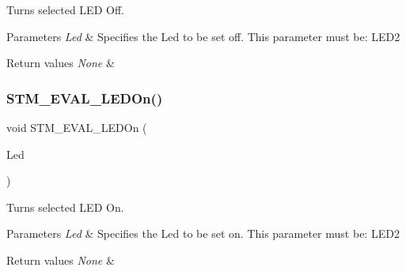 Turns selected L\+ED Off. 


\begin{DoxyParams}{Parameters}
{\em Led} & Specifies the Led to be set off. This parameter must be\+: L\+E\+D2 \\
\hline
\end{DoxyParams}

\begin{DoxyRetVals}{Return values}
{\em None} & \\
\hline
\end{DoxyRetVals}
\mbox{\label{group___s_t_m32_f1_x_x___n_u_c_l_e_o___l_o_w___l_e_v_e_l___exported___functions_gad27fa430d867e6dde94cb7896fcc42fc}} 
\subsubsection{\texorpdfstring{STM\_EVAL\_LEDOn()}{STM\_EVAL\_LEDOn()}}
{\footnotesize\ttfamily void S\+T\+M\+\_\+\+E\+V\+A\+L\+\_\+\+L\+E\+D\+On (\begin{DoxyParamCaption}\item[{\mbox{\hyperlink{group___s_t_m32_f1_x_x___n_u_c_l_e_o___l_o_w___l_e_v_e_l___exported___types_gaa059704b7ca945eb9c1e7f2c3d03fecd}{Led\+\_\+\+Type\+Def}}}]{Led }\end{DoxyParamCaption})}



Turns selected L\+ED On. 


\begin{DoxyParams}{Parameters}
{\em Led} & Specifies the Led to be set on. This parameter must be\+: L\+E\+D2 \\
\hline
\end{DoxyParams}

\begin{DoxyRetVals}{Return values}
{\em None} & \\
\hline
\end{DoxyRetVals}
\mbox{\label{group___s_t_m32_f1_x_x___n_u_c_l_e_o___l_o_w___l_e_v_e_l___exported___functions_ga5b1ccd57cf505c1d41440e62a845e4a9}} 
